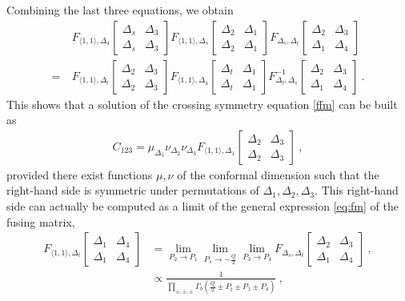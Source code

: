 \documentclass[12pt, a4paper, notitlepage, twoside]{report}
\numberwithin{equation}{section}
\theoremstyle{break}
\begin{document}
Combining the last three equations, we obtain
\begin{align}
 & F_{\langle 1,1\rangle, \Delta_{4}} \begin{bmatrix} \Delta_s & \Delta_3\\ \Delta_s & \Delta_3\end{bmatrix}  
 F_{\langle 1,1\rangle, \Delta_{s}} \begin{bmatrix} \Delta_2 & \Delta_1\\ \Delta_2 & \Delta_1\end{bmatrix}  
 F_{\Delta_s,\Delta_t}\begin{bmatrix} \Delta_2 & \Delta_3 \\ \Delta_1 & \Delta_4 \end{bmatrix}
 \nonumber
 \\
=\ & 
F_{\langle 1,1\rangle, \Delta_{t}} \begin{bmatrix} \Delta_2 & \Delta_3\\ \Delta_2 & \Delta_3\end{bmatrix}
F_{\langle 1,1\rangle, \Delta_{4}} \begin{bmatrix} \Delta_t & \Delta_1\\ \Delta_t & \Delta_1\end{bmatrix}
F^{-1}_{\Delta_t,\Delta_s}\begin{bmatrix} \Delta_2 & \Delta_3 \\ \Delta_1 & \Delta_4 \end{bmatrix}
\ .
\end{align}
This shows that a solution of the crossing symmetry equation \eqref{ffm} can be built as
\begin{align}
 C_{123} = \mu_{\Delta_1} \nu_{\Delta_2}\nu_{\Delta_3}F_{\langle 1,1\rangle, \Delta_{1}} \begin{bmatrix} \Delta_2 & \Delta_3\\ \Delta_2 & \Delta_3\end{bmatrix}\ ,
 \label{cmnnf}
\end{align}
provided there exist functions $\mu,\nu$ of the conformal dimension such that 
the right-hand side is symmetric under permutations of $\Delta_1,\Delta_2,\Delta_3$. 
This right-hand side can actually be computed as a limit of the general expression \eqref{eq:fm} of the fusing matrix,
\begin{align}
 F_{\langle 1,1\rangle, \Delta_{t}} \begin{bmatrix} \Delta_1 & \Delta_4\\ \Delta_1 & \Delta_4\end{bmatrix} 
 & = 
 \lim_{P_2\to P_1}\lim_{P_s\to -\frac{Q}{2}} \lim_{P_3\to P_4} 
 F_{\Delta_s,\Delta_t}\begin{bmatrix} \Delta_2 & \Delta_3 \\ \Delta_1 & \Delta_4 \end{bmatrix} \ ,
 \label{eq:flim}
 \\
  &\propto \frac{1}{\prod_{\pm,\pm,\pm} \Gamma_b(\frac{Q}{2} \pm P_t\pm P_1\pm P_4)}\ ,
  \label{eq:fdozz}
\end{align}
\end{document}
